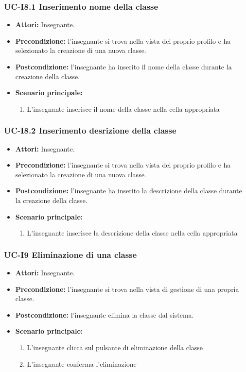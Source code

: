 \subsubsection{UC-I8.1 Inserimento nome della classe}
\begin{itemize}
	\item \textbf{Attori:} Insegnante.
	\item \textbf{Precondizione:} l'insegnante si trova nella vista del proprio profilo e ha selezionato la creazione di una nuova classe.
	\item \textbf{Postcondizione:} l'insegnante ha inserito il nome della classe durante la creazione della classe.
	\item \textbf{Scenario principale:}
	\begin{enumerate}
		\item L'insegnante inserisce il nome della classe nella cella appropriata
	\end{enumerate}
\end{itemize}

\subsubsection{UC-I8.2 Inserimento desrizione della classe}
\begin{itemize}
	\item \textbf{Attori:} Insegnante.
	\item \textbf{Precondizione:} l'insegnante si trova nella vista del proprio profilo e ha selezionato la creazione di una nuova classe.
	\item \textbf{Postcondizione:} l'insegnante ha inserito la descrizione della classe durante la creazione della classe.
	\item \textbf{Scenario principale:}
	\begin{enumerate}
		\item L'insegnante inserisce la descrizione della classe nella cella appropriata
	\end{enumerate}
\end{itemize}

\subsubsection{UC-I9 Eliminazione di una classe}
\begin{itemize}
	\item \textbf{Attori:} Insegnante.
	\item \textbf{Precondizione:} l'insegnante si trova nella vista di gestione di una propria classe.
	\item \textbf{Postcondizione:} l'insegnante elimina la classe dal sistema.
	\item \textbf{Scenario principale:}
	\begin{enumerate}
		\item L'insegnante clicca sul pulsante di eliminazione della classe
		\item L'insegnante conferma l'eliminazione
	\end{enumerate}
\end{itemize}

